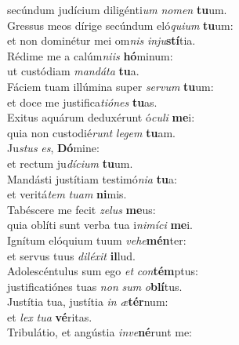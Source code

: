 \evenverse secúndum judícium diligénti\textit{um} \textit{no}\textit{men} \textbf{tu}um.\\
\oddverse Gressus meos dírige secúndum eló\textit{qui}\textit{um} \textbf{tu}um:~\*\\
\oddverse et non dominétur mei om\textit{nis} \textit{in}\textit{ju}\textbf{stí}tia.\\
\evenverse Rédime me a calúm\textit{ni}\textit{is} \textbf{hó}minum:~\*\\
\evenverse ut custódiam \textit{man}\textit{dá}\textit{ta} \textbf{tu}a.\\
\oddverse Fáciem tuam illúmina super \textit{ser}\textit{vum} \textbf{tu}um:~\*\\
\oddverse et doce me justifica\textit{ti}\textit{ó}\textit{nes} \textbf{tu}as.\\
\evenverse Exitus aquárum deduxérunt ó\textit{cu}\textit{li} \textbf{me}i:~\*\\
\evenverse quia non custodié\textit{runt} \textit{le}\textit{gem} \textbf{tu}am.\\
\oddverse Ju\textit{stus} \textit{es}, \textbf{Dó}mine:~\*\\
\oddverse et rectum ju\textit{dí}\textit{ci}\textit{um} \textbf{tu}um.\\
\evenverse Mandásti justítiam testimó\textit{ni}\textit{a} \textbf{tu}a:~\*\\
\evenverse et veritá\textit{tem} \textit{tu}\textit{am} \textbf{ni}mis.\\
\oddverse Tabéscere me fecit \textit{ze}\textit{lus} \textbf{me}us:~\*\\
\oddverse quia oblíti sunt verba tua i\textit{ni}\textit{mí}\textit{ci} \textbf{me}i.\\
\evenverse Ignítum elóquium tuum \textit{ve}\textit{he}\textbf{mén}ter:~\*\\
\evenverse et servus tuus \textit{di}\textit{lé}\textit{xit} \textbf{il}lud.\\
\oddverse Adolescéntulus sum ego \textit{et} \textit{con}\textbf{tém}ptus:~\*\\
\oddverse justificatiónes tuas \textit{non} \textit{sum} \textit{o}\textbf{blí}tus.\\
\evenverse Justítia tua, justítia \textit{in} \textit{æ}\textbf{tér}num:~\*\\
\evenverse et \textit{lex} \textit{tu}\textit{a} \textbf{vé}ritas.\\
\oddverse Tribulátio, et angústia \textit{in}\textit{ve}\textbf{né}runt me:~\*\\
